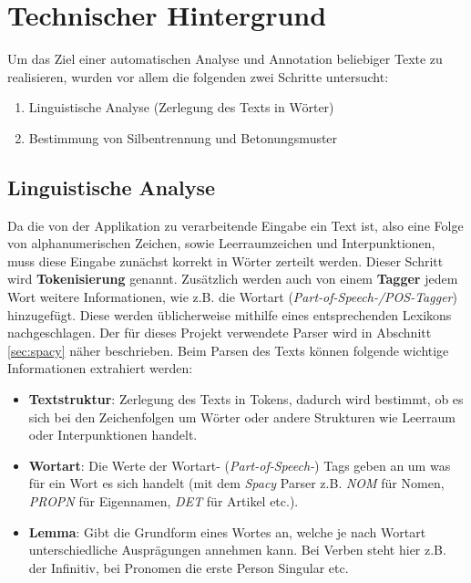 \section{Technischer Hintergrund}

Um das Ziel einer automatischen Analyse und Annotation beliebiger Texte zu realisieren, wurden vor allem die folgenden zwei Schritte untersucht:
\begin{enumerate}
	\item Linguistische Analyse (Zerlegung des Texts in Wörter)
	\item Bestimmung von Silbentrennung und Betonungsmuster
\end{enumerate}

\subsection{Linguistische Analyse}
Da die von der Applikation zu verarbeitende Eingabe ein Text ist, also eine Folge von alphanumerischen Zeichen, sowie Leerraumzeichen und Interpunktionen, muss diese Eingabe zunächst korrekt in Wörter zerteilt werden. Dieser Schritt wird \textbf{Tokenisierung} genannt. Zusätzlich werden auch von einem \textbf{Tagger} jedem Wort weitere Informationen, wie z.B. die Wortart (\textit{Part-of-Speech-/POS-Tagger}) hinzugefügt. Diese werden üblicherweise mithilfe eines entsprechenden Lexikons nachgeschlagen\cite{Carstensen2004}. Der für dieses Projekt verwendete Parser wird in Abschnitt \ref{sec:spacy} näher beschrieben. Beim Parsen des Texts können folgende wichtige Informationen extrahiert werden:

\begin{itemize}
	\item \textbf{Textstruktur}: Zerlegung des Texts in Tokens, dadurch wird bestimmt, ob es sich bei den Zeichenfolgen um Wörter oder andere Strukturen wie Leerraum oder Interpunktionen handelt.
	
	\item \textbf{Wortart}: Die Werte der Wortart- (\textit{Part-of-Speech-}) Tags geben an um was für ein Wort es sich handelt (mit dem \textit{Spacy} Parser z.B. \textit{NOM} für Nomen, \textit{PROPN} für Eigennamen, \textit{DET} für Artikel etc.).
	\item  \textbf{Lemma}: Gibt die Grundform eines Wortes an, welche je nach Wortart unterschiedliche Ausprägungen annehmen kann. Bei Verben steht hier z.B. der Infinitiv, bei Pronomen die erste Person Singular etc.
\end{itemize}

